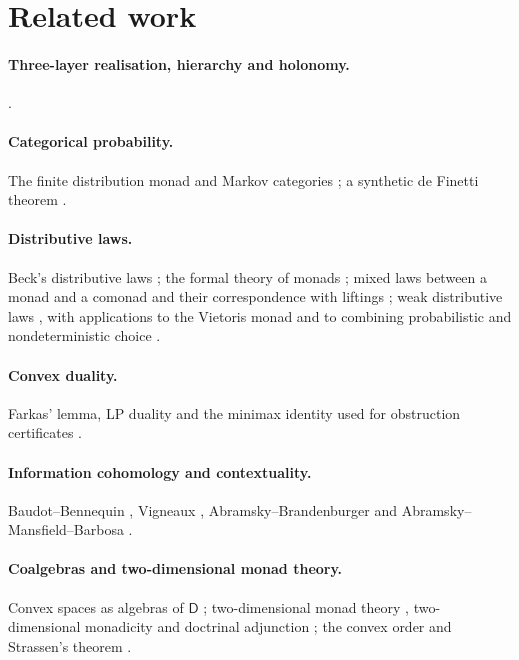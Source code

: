 \documentclass[11pt]{article}
\theoremstyle{definition}
\theoremstyle{remark}
\newcommand{\D}{\mathsf{D}}
\begin{document}
\section{Related work}

\paragraph{Three-layer realisation, hierarchy and holonomy.}
\cite{Awasthi-ThreeLayers,Awasthi-Hierarchy,Awasthi-Holonomy}.
\paragraph{Categorical probability.} The finite distribution monad and Markov categories
\cite{Fritz2020,FGPR2023}; a synthetic de Finetti theorem \cite{FGP2021}.
\paragraph{Distributive laws.} Beck's distributive laws \cite{Beck1969}; the formal theory of monads
\cite{Street1972}; mixed laws between a monad and a comonad and their correspondence with liftings
\cite{PowerWatanabe2002}; weak distributive
laws \cite{Street2009,Bohm2010,BohmLackStreet2011}, with applications to the Vietoris monad
\cite{Garner2020} and to combining probabilistic and nondeterministic choice \cite{GoyPetrisan2020}.
\paragraph{Convex duality.} Farkas' lemma, LP duality and the minimax identity used for
obstruction certificates \cite{Schrijver1986}.
\paragraph{Information cohomology and contextuality.} Baudot--Bennequin \cite{BaudotBennequin2015},
Vigneaux \cite{Vigneaux2019}, Abramsky--Brandenburger \cite{AbramskyBrandenburger2011} and
Abramsky--Mansfield--Barbosa \cite{AbramskyMansfieldBarbosa2012}.
\paragraph{Coalgebras and two-dimensional monad theory.} Convex spaces as algebras of $\D$
\cite{Fritz2009}; two-dimensional monad theory \cite{BKP1989,Lack2002}, two-dimensional monadicity
\cite{Bourke2014} and doctrinal adjunction \cite{Kelly1974}; the convex order and Strassen's theorem
\cite{Strassen1965}.
\end{document}
